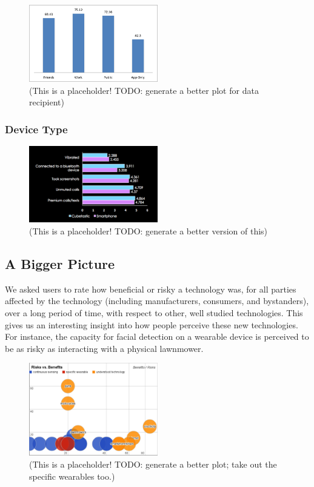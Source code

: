 \documentclass{acm_proc_article-sp}
\begin{document}
\begin{figure}
	\centering
	\includegraphics[width=0.5\textwidth]{recipient.png}
	\caption{(This is a placeholder! TODO: generate a better plot for data recipient)}
\end{figure}

\subsubsection{Device Type}


\begin{figure}
	\centering
	\includegraphics[width=0.5\textwidth]{device-type.png}
	\caption{(This is a placeholder! TODO: generate a better version of this)}
\end{figure}

\subsection{A Bigger Picture}

We asked users to rate how beneficial or risky a technology was, for all parties affected by the technology (including manufacturers, consumers, and bystanders), over a long period of time, with respect to other, well studied technologies. This gives us an interesting insight into how people perceive these new technologies. For instance, the capacity for facial detection on a wearable device is perceived to be as risky as interacting with a physical lawnmower. 

\begin{figure}
	\centering
	\includegraphics[width=0.5\textwidth]{techplot.png}
	\caption{(This is a placeholder! TODO: generate a better plot; take out the specific wearables too.)}
\end{figure}
\end{document}
